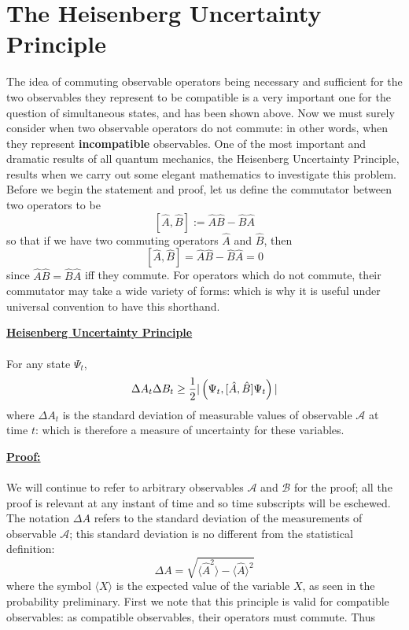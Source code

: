 \section{The Heisenberg Uncertainty Principle}
The idea of commuting observable operators being necessary and sufficient for the two observables they represent to be compatible is a very important one for the question of simultaneous states, and has been shown above. Now we must surely consider when two observable operators do not commute: in other words, when they represent \textbf{incompatible} observables. One of the most important and dramatic results of all quantum mechanics, the Heisenberg Uncertainty Principle, results when we carry out some elegant mathematics to investigate this problem. Before we begin the statement and proof, let us define the commutator between two operators to be 
$$
[\hat{A},\hat{B}]:=\hat{A}\hat{B}-\hat{B}\hat{A}
$$
so that if we have two commuting operators $\hat{A}$ and $\hat{B}$, then 
$$
[\hat{A},\hat{B}]=\hat{A}\hat{B}-\hat{B}\hat{A}=0
$$
since $\hat{A}\hat{B}=\hat{B}\hat{A}$ iff they commute. For operators which do not commute, their commutator may take a wide variety of forms: which is why it is useful under universal convention to have this shorthand.
\begin{tcolorbox}
\textbf{\underline{Heisenberg Uncertainty Principle}}\\\\
For any state $\Psi_{t}$,
$$
\Delta A_{t}\Delta B_{t}\geq\frac{1}{2}|\left(\Psi_{t},[\hat{A},\hat{B}]\Psi_{t}\right)|
$$
where $\Delta A_{t}$ is the standard deviation of measurable values of observable $\mathcal{A}$ at time $t$: which is therefore a measure of uncertainty for these variables.
\end{tcolorbox}
\underline{\textbf{Proof:}}\\\\
We will continue to refer to arbitrary observables $\mathcal{A}$ and $\mathcal{B}$ for the proof; all the proof is relevant at any instant of time and so time subscripts will be eschewed. The notation $\Delta A$ refers to the standard deviation of the measurements of observable $\mathcal{A}$; this standard deviation is no different from the statistical definition:
$$
\Delta A=\sqrt{\langle \hat{A}^2\rangle-\langle \hat{A}\rangle^2}
$$
where the symbol $\langle X\rangle$ is the expected value of the variable $X$, as seen in the probability preliminary. First we note that this principle is valid for compatible observables: as compatible observables, their operators must commute. Thus
